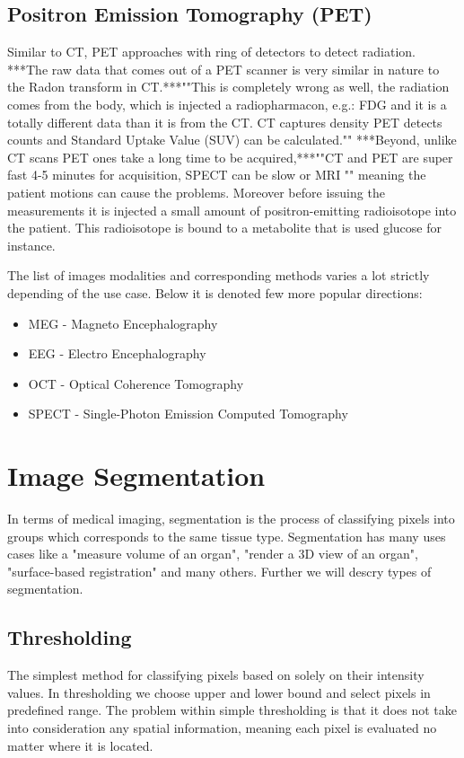 \subsection{Positron Emission Tomography (PET)}      
Similar to CT, PET approaches with ring of detectors to detect radiation. ***The raw data that comes out of a PET scanner is very similar in nature to the Radon transform in CT.***""This is completely wrong as well, the radiation comes from the body, which is injected a radiopharmacon, e.g.: FDG and it is a totally different data than it is from the CT. CT captures density PET detects counts and Standard Uptake Value (SUV) can be calculated."" ***Beyond, unlike CT scans PET ones take a long time to be acquired,***""CT and PET are super fast 4-5 minutes for acquisition, SPECT can be slow or MRI "" meaning the patient motions can cause the problems. Moreover before issuing the measurements it is injected a small amount of positron-emitting radioisotope into the patient. This radioisotope is bound to a metabolite that is used glucose for instance.        

The list of images modalities and corresponding methods varies a lot strictly depending of the use case.
Below it is denoted few more popular directions:
\begin{itemize}
    \item MEG - Magneto Encephalography
    \item EEG - Electro Encephalography
    \item OCT - Optical Coherence Tomography
    \item SPECT - Single-Photon Emission Computed Tomography
\end{itemize}


\section{Image Segmentation}
In terms of medical imaging, segmentation is the process of classifying pixels into groups which corresponds to the same tissue type. Segmentation has many uses cases like a "measure volume of an organ", "render a 3D view of an organ", "surface-based registration" and many others. Further we will descry types of segmentation. 

\subsection{Thresholding}
The simplest method for classifying pixels based on solely on their intensity values. In thresholding we choose upper and lower bound and select pixels in predefined range.
The problem within simple thresholding is that it does not take into consideration any spatial information, meaning each pixel is evaluated no matter where it is located.    

